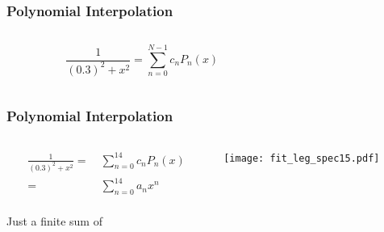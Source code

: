 \begin{frame}
  \frametitle{Polynomial Interpolation\\
    }
  \begin{columns}
    \begin{column}{0.35\textwidth}
      \begin{equation*}
        \frac{1}{(0.3)^2+x^2} = \sum_{n=0}^{N-1} c_n P_n(x)
      \end{equation*}
    \end{column}
    \begin{column}{0.65\textwidth}
  \begin{center}
  \end{center}
    \end{column}
  \end{columns}
\end{frame}

\begin{frame}
  \frametitle{Polynomial Interpolation\\
    }
  \begin{columns}
    \begin{column}{0.35\textwidth}
      \begin{align*}
        \frac{1}{(0.3)^2+x^2} = &~\sum_{n=0}^{14} c_n P_n(x) \\
                             = &~\sum_{n=0}^{14} a_n x^n \\
      \end{align*}
      \begin{center}
        Just a finite sum of 
        \end{center}
    \end{column}
    \begin{column}{0.65\textwidth}
  \begin{center}
   \texttt{[image: fit\_leg\_spec15.pdf]}
  \end{center}
    \end{column}
  \end{columns}
\end{frame}

